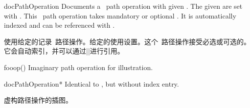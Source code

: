 % 
% 

% 





\begin{docEnvironment}[doclang/environment content=operation description,
  doc new and updated={2019-09-18}{2020-04-22}]{docPathOperation}{}
Documents a \tikzname\ path operation with given .
The given  are set with .
This \tikzname\ path operation takes mandatory or optional .
It is automatically indexed and can be referenced with
.

使用给定的记录\tikzname\ 路径操作。给定的使用设置。这个\tikzname\ 路径操作接受必选或可选的。它会自动索引，并可以通过||进行引用。
\begin{dispExample}
\begin{docPathOperation}{fooop}{()}
Imaginary path operation for illustration.
\end{docPathOperation}
\end{dispExample}
\end{docEnvironment}


\begin{docEnvironment}[doclang/environment content=command description,
  doc new and updated={2019-09-18}{2020-04-22}]{docPathOperation*}{}
Identical to , but without index entry.

虚构路径操作的插图。
\end{docEnvironment}




